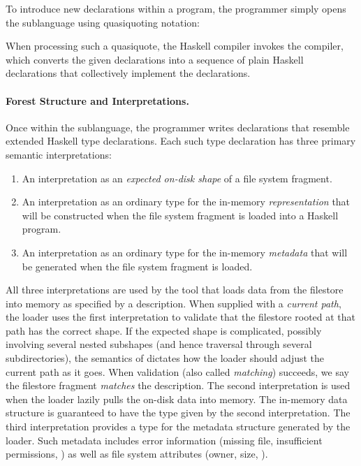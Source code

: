 To introduce new \forest{} declarations within a \haskell{} program,
the programmer simply opens the \forest{} sublanguage using
quasiquoting notation:
\begin{code}
\end{code}
When processing such a quasiquote, the Haskell compiler invokes the
\forest{} compiler,  which converts the given \forest{} declarations
into a sequence of plain Haskell declarations that collectively
implement the \forest{} declarations.

\paragraph*{Forest Structure and Interpretations.}
Once within the \forest{} sublanguage, the programmer writes
declarations that resemble extended Haskell type declarations. 
Each such type declaration has three primary semantic interpretations: 
\begin{enumerate}
\item An interpretation as an {\em expected on-disk shape} of a file system 
    fragment.  
\item An interpretation as an ordinary \haskell{} type for the in-memory {\em representation}
    that will be constructed when the file system 
     fragment is loaded into 
     a Haskell program. 
\item An interpretation as an ordinary \haskell{} type for the in-memory 
   {\em metadata}
    that will be generated when the file system fragment is loaded.
\end{enumerate}
All three interpretations are used by the tool that loads data from
the filestore into memory as specified by a \forest{} description.  
When supplied with
a {\em current path}, the loader uses the first interpretation 
to validate that the filestore rooted at that
path has the correct shape.  
If the expected shape is complicated,
possibly involving several nested subshapes (and hence
traversal through several subdirectories), the semantics of \forest{}
dictates how the loader should adjust the current path 
as it goes.  When validation (also called {\em matching}) succeeds, we
say the filestore fragment {\em matches} the description.
The second interpretation is used when the loader
lazily pulls the on-disk data into memory. 
The in-memory data structure is guaranteed to have the 
\haskell{} type given by the second interpretation.
The third interpretation provides a
type for the metadata structure generated by the loader.
Such metadata includes error information (missing file, insufficient
permissions, \etc{})  as well as file system attributes (owner, size, \etc{}).

